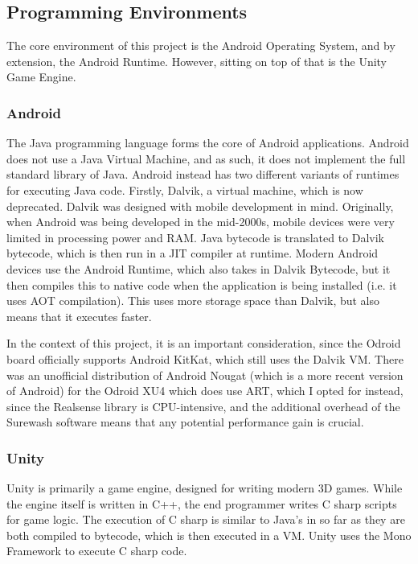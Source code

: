     \subsection{Programming Environments}
    The core environment of this project is the Android Operating System, and by extension, the Android Runtime. However, sitting on top of that is the Unity Game Engine.
        \subsubsection{Android}
        The Java programming language forms the core of Android applications. Android does not use a Java Virtual Machine, and as such, it does not implement the full standard library of Java. Android instead has two different variants of runtimes for executing Java code. Firstly, Dalvik, a virtual machine, which is now deprecated. Dalvik was designed with mobile development in mind. Originally, when Android was being developed in the mid-2000s, mobile devices were very limited in processing power and RAM. Java bytecode is translated to Dalvik bytecode, which is then run in a JIT compiler at runtime. Modern Android devices use the Android Runtime, which also takes in Dalvik Bytecode, but it then compiles this to native code when the application is being installed (i.e. it uses AOT compilation). This uses more storage space than Dalvik, but also means that it executes faster.

        In the context of this project, it is an important consideration, since the Odroid board officially supports Android KitKat, which still uses the Dalvik VM. There was an unofficial distribution of Android Nougat (which is a more recent version of Android) for the Odroid XU4 which does use ART, which I opted for instead, since the Realsense library is CPU-intensive, and the additional overhead of the Surewash software means that any potential performance gain is crucial.
    
        \subsubsection{Unity}
        Unity is primarily a game engine, designed for writing modern 3D games. While the engine itself is written in C++, the end programmer writes C sharp scripts for game logic. The execution of C sharp is similar to Java's in so far as they are both compiled to bytecode, which is then executed in a VM. Unity uses the Mono Framework to execute C sharp code.
    
